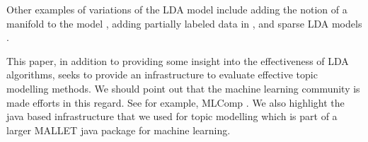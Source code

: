 Other examples of variations of the LDA model include adding the
notion of a manifold to the model \cite{DTM}, adding partially labeled
data in \cite{}, and sparse LDA models
\cite{MimnoSparse}. 

This paper, in addition to providing some insight into the
effectiveness of LDA algorithms, seeks to provide an infrastructure to
evaluate effective topic modelling methods. We should point out that
the machine learning community is made efforts in this regard.  See
for example, MLComp \cite{MLComp}. We also highlight the java based
infrastructure that we used for topic modelling \cite{McCallumMALLET}
which is part of a larger MALLET java package for machine learning.
